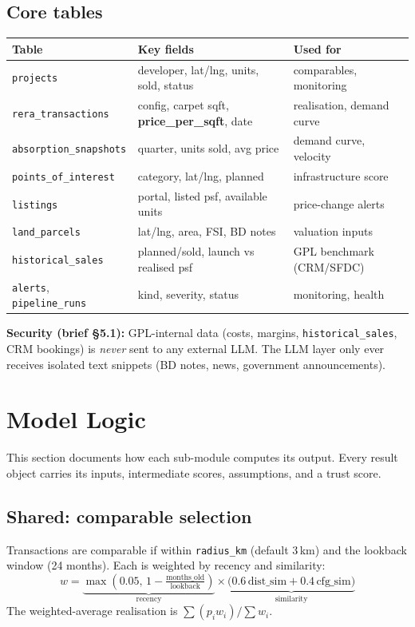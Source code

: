 \documentclass[11pt,a4paper]{article}
\begin{document}
\subsection{Core tables}
\begin{longtable}{p{3.3cm} p{4.5cm} p{5cm}}
\toprule
\textbf{Table} & \textbf{Key fields} & \textbf{Used for} \\
\midrule
\texttt{projects} & developer, lat/lng, units, sold, status & comparables, monitoring \\
\texttt{rera\_transactions} & config, carpet sqft, \textbf{price\_per\_sqft}, date & realisation, demand curve \\
\texttt{absorption\_snapshots} & quarter, units sold, avg price & demand curve, velocity \\
\texttt{points\_of\_interest} & category, lat/lng, planned & infrastructure score \\
\texttt{listings} & portal, listed psf, available units & price-change alerts \\
\texttt{land\_parcels} & lat/lng, area, FSI, BD notes & valuation inputs \\
\texttt{historical\_sales} & planned/sold, launch vs realised psf & GPL benchmark (CRM/SFDC) \\
\texttt{alerts}, \texttt{pipeline\_runs} & kind, severity, status & monitoring, health \\
\bottomrule
\end{longtable}

\noindent\textbf{Security (brief \S5.1):} GPL-internal data (costs, margins,
\texttt{historical\_sales}, CRM bookings) is \emph{never} sent to any external
LLM. The LLM layer only ever receives isolated text snippets (BD notes, news,
government announcements).

\section{Model Logic}
This section documents how each sub-module computes its output. Every result
object carries its inputs, intermediate scores, assumptions, and a trust score.

\subsection{Shared: comparable selection}
Transactions are comparable if within \texttt{radius\_km} (default 3\,km) and the
lookback window (24 months). Each is weighted by recency and similarity:
\[
w = \underbrace{\max\!\left(0.05,\,1-\tfrac{\text{months\_old}}{\text{lookback}}\right)}_{\text{recency}}
\times \underbrace{\big(0.6\,\text{dist\_sim} + 0.4\,\text{cfg\_sim}\big)}_{\text{similarity}}
\]
The weighted-average realisation is $\sum (p_i w_i)/\sum w_i$.
\end{document}
